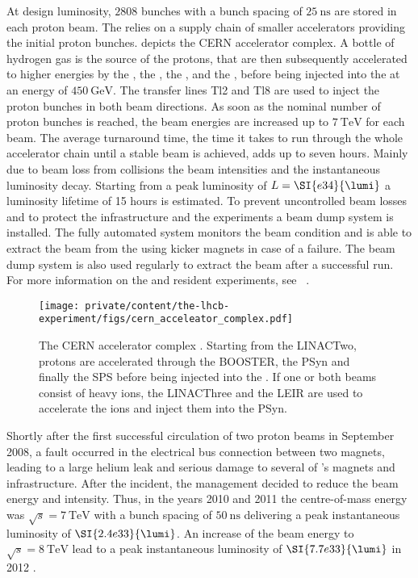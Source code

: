 At design luminosity, $\num{2808}$ bunches with a bunch spacing of
$\SI{25}{\nano\second}$ are stored in each proton beam. The \LHC relies on a
supply chain of smaller accelerators providing the initial proton bunches.
 depicts the \acs{CERN}
accelerator complex. A bottle of hydrogen gas is the source of the protons, that
are then subsequently accelerated to higher energies by the \LINACTwo, the
\BOOSTER, the \PSyn, and the \SPS, before being injected into the \LHC at an
energy of $\SI{450}{\GeV}$. The transfer lines Tl2 and Tl8 are used to inject
the proton bunches in both beam directions. As soon as the nominal number of
proton bunches is reached, the beam energies are increased up to $\SI{7}{\TeV}$
for each beam. The average \LHC turnaround time, \ie the time it takes to run
through the whole accelerator chain until a stable beam is achieved, adds up to
seven hours. Mainly due to beam loss from \pp collisions the beam intensities
and the instantaneous luminosity decay. Starting from a peak luminosity of
$L=\SI{e34}{\lumi}$ a luminosity lifetime of 15 hours is estimated. To prevent
uncontrolled beam losses and to protect the \LHC infrastructure and the \LHC
experiments a beam dump system is installed. The fully automated system monitors
the beam condition and is able to extract the beam from the \LHC using kicker
magnets in case of a failure. The beam dump system is also used regularly to
extract the beam after a successful run. For more information on the \LHC and
resident experiments, see \eg \Ref~\cite{Evans:2008zzb}.

\begin{figure}[t]
  \texttt{[image: private/content/the-lhcb-experiment/figs/cern\_acceleator\_complex.pdf]}
  \caption{
  The \acs{CERN} accelerator complex \cite{Christiane:1260465}. Starting from
  the \acs{LINACTwo}, protons are accelerated through the \acs{BOOSTER}, the
  \acs{PSyn} and finally the \acs{SPS} before being injected into the \LHC. If
  one or both beams consist of heavy ions, the \acs*{LINACThree} and the
  \acs*{LEIR} are used to accelerate the ions and inject them into the
  \acs{PSyn}. }
  \label{fig:lhcb_experiment:lhc:cern_accelerator_complex}
\end{figure}

Shortly after the first successful circulation of two proton beams in September
2008, a fault occurred in the electrical bus connection between two magnets,
leading to a large helium leak and serious damage to several of \LHC's magnets
and infrastructure. After the incident, the management decided to reduce the
beam energy and intensity. Thus, in the years 2010 and 2011 the \LHC
centre-of-mass energy was $\sqrt{s}=\SI{7}{\TeV}$ with a bunch spacing of
$\SI{50}{\nano\second}$ delivering a peak instantaneous luminosity of
$\SI{2.4e33}{\lumi}$. An increase of the beam energy to $\sqrt{s}=\SI{8}{\TeV}$
lead to a peak instantaneous luminosity of $\SI{7.7e33}{\lumi}$ in 2012
\cite{Lamont:2013cma}.

